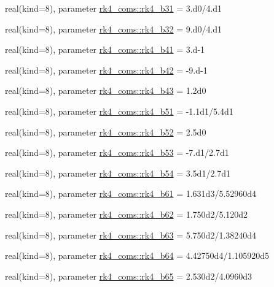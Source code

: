 \begin{DoxyCompactItemize}
\item 
real(kind=8), parameter \hyperlink{namespacerk4__coms_a25fefbdc031aa0c923082df76e233542}{rk4\+\_\+coms\+::rk4\+\_\+b31} = 3.d0/4.d1
\item 
real(kind=8), parameter \hyperlink{namespacerk4__coms_aeadece49a8e779db69ab3c866d710851}{rk4\+\_\+coms\+::rk4\+\_\+b32} = 9.d0/4.d1
\item 
real(kind=8), parameter \hyperlink{namespacerk4__coms_a027909c6e9575ba7ea384f530f1fea8c}{rk4\+\_\+coms\+::rk4\+\_\+b41} = 3.d-\/1
\item 
real(kind=8), parameter \hyperlink{namespacerk4__coms_a8e97d0778db0718264f454af0d04e0da}{rk4\+\_\+coms\+::rk4\+\_\+b42} = -\/9.d-\/1
\item 
real(kind=8), parameter \hyperlink{namespacerk4__coms_a5c0f66631b902af266e04130bea41001}{rk4\+\_\+coms\+::rk4\+\_\+b43} = 1.\+2d0
\item 
real(kind=8), parameter \hyperlink{namespacerk4__coms_a0667d689a2690f395681dd54718dd9b0}{rk4\+\_\+coms\+::rk4\+\_\+b51} = -\/1.\+1d1/5.\+4d1
\item 
real(kind=8), parameter \hyperlink{namespacerk4__coms_a08136775ca79aa4cfb6e2bc844bfb689}{rk4\+\_\+coms\+::rk4\+\_\+b52} = 2.\+5d0
\item 
real(kind=8), parameter \hyperlink{namespacerk4__coms_adedd306e0a9a351610026b3a12d2e5ce}{rk4\+\_\+coms\+::rk4\+\_\+b53} = -\/7.d1/2.\+7d1
\item 
real(kind=8), parameter \hyperlink{namespacerk4__coms_a3d702309397c009b9a62c0900da4a7c5}{rk4\+\_\+coms\+::rk4\+\_\+b54} = 3.\+5d1/2.\+7d1
\item 
real(kind=8), parameter \hyperlink{namespacerk4__coms_a69b8b27ac5165b14e52efd1d57e3247d}{rk4\+\_\+coms\+::rk4\+\_\+b61} = 1.\+631d3/5.\+52960d4
\item 
real(kind=8), parameter \hyperlink{namespacerk4__coms_a1424e7b77cc58817b30146a6ed80c076}{rk4\+\_\+coms\+::rk4\+\_\+b62} = 1.\+750d2/5.\+120d2
\item 
real(kind=8), parameter \hyperlink{namespacerk4__coms_a2943f8989d0d72c6913d114141dcfe5d}{rk4\+\_\+coms\+::rk4\+\_\+b63} = 5.\+750d2/1.\+38240d4
\item 
real(kind=8), parameter \hyperlink{namespacerk4__coms_a6738b7b2098994211bfcafa79e4cc584}{rk4\+\_\+coms\+::rk4\+\_\+b64} = 4.\+42750d4/1.\+105920d5
\item 
real(kind=8), parameter \hyperlink{namespacerk4__coms_a5635aa326f6d3f256b21cb6aaf2d4ed0}{rk4\+\_\+coms\+::rk4\+\_\+b65} = 2.\+530d2/4.\+0960d3
\item 

\end{DoxyCompactItemize}
